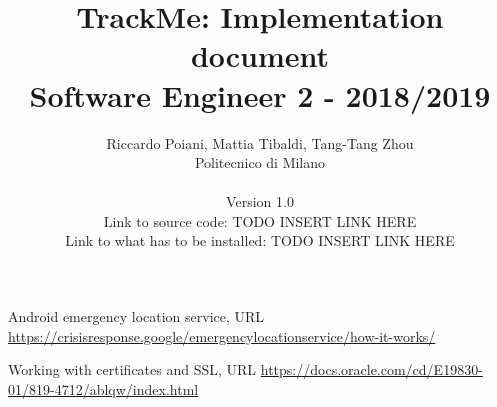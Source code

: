 \documentclass[a4paper]{article}
\begin{document}
\title{TrackMe: Implementation document \\Software Engineer 2 - 2018/2019}
\author{
        Riccardo Poiani, Mattia Tibaldi, Tang-Tang Zhou \\
        Politecnico di Milano\\\\ 
        Version 1.0 \\
        Link to source code: TODO INSERT LINK HERE \\
		Link to what has to be installed: TODO INSERT LINK HERE \\
}
\maketitle
\newpage
\tableofcontents
\newpage













\newpage

\begin{thebibliography}{9}

Android emergency location service, URL \url{https://crisisresponse.google/emergencylocationservice/how-it-works/}

Working with certificates and SSL, URL \url{https://docs.oracle.com/cd/E19830-01/819-4712/ablqw/index.html}

\end{thebibliography}
\end{document}
